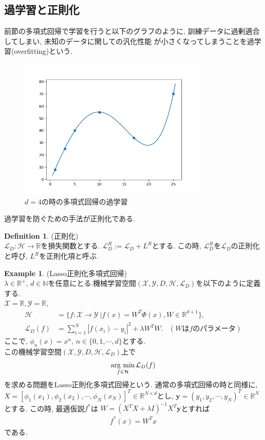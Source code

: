 \documentclass[11pt, a4paper, dvipdfmx]{jsarticle}
\theoremstyle{definition}
\newtheorem{Definition+}[Axiom+]{Definition}
\newtheorem{Example+}[Axiom+]{Example}
\newcommand{\N}{\mathbb{N}}
\newcommand{\R}{\mathbb{R}}
\newcommand{\X}{\mathcal{X}}
\newcommand{\Y}{\mathcal{Y}}
\newcommand{\Hil}{\mathcal{H}}
\newcommand{\Loss}{\mathcal{L}_{D}}
\newcommand{\MLsp}{(\X, \Y, D, \Hil, \Loss)}
\newcommand{\argmin}{\mathop{\rm arg~min}\limits}
\begin{document}
\subsection{過学習と正則化}
前節の多項式回帰で学習を行うと以下のグラフのように, 訓練データに過剰適合してしまい, 未知のデータに関しての汎化性能
が小さくなってしまうことを過学習(overfitting)という. 
\begin{figure}[H]
    \centering
    \includegraphics[width = 9.0cm]{overfitting_PR.png}
    \caption{$d = 4$の時の多項式回帰の過学習}
\end{figure}
過学習を防ぐための手法が正則化である.
\begin{Definition+}(正則化)\\
    $\Loss:\Hil\to\R$を損失関数とする. $\Loss^{R} := \Loss + L^{R}$とする.
    この時, $\Loss^{R}$を$\Loss$の正則化と呼び, $L^R$を正則化項と呼ぶ.
\end{Definition+}
\begin{Example+}(Lasso正則化多項式回帰)\\
    $\lambda\in\R^{+}$, $d\in\N$を任意にとる.機械学習空間$\MLsp$を以下のように定義する.\\
    $\X = \R, \Y = \R$, 
    \begin{align*}
        \Hil &= \{f:\X\to\Y~| f(x) = W^{T}\Phi(x), W\in\R^{d + 1}\},\\
        \Loss(f) &= \sum_{i = 1}^{N}|f(x_i) - y_i|^2+\lambda W^TW.\hspace{10pt}　(W\text{は$f$のパラメータ})
    \end{align*}
    ここで, $\phi_{n}(x) = x^{n}$, $n\in\{0, 1, \cdots, d\}$とする.\\
    この機械学習空間$\MLsp$上で
    \begin{align*}
        \argmin_{f\in\Hil}\Loss(f)
    \end{align*}
    を求める問題をLasso正則化多項式回帰という. 通常の多項式回帰の時と同様に, $X = [\phi_{1}(x_1), \phi_{2}(x_{2}), \cdots, \phi_{N}(x_N)]^{T}\in\R^{N\times d}$とし, 
    $\mathbf{y} = (y_{1}, y_{2}, \cdots, y_{N})^{T}\in\R^{N}$とする. この時, 最適仮説$f^{*}$は
    $W = (X^TX + \lambda I)^{-1}X^T\mathbf{y}$とすれば
    \begin{align*}
        f^{*}(x) = W^{T}x
    \end{align*}
    である. 
\end{Example+}
\end{document}
